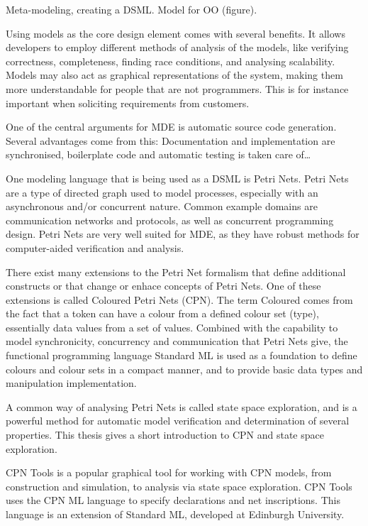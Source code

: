 Meta-modeling, creating a DSML. Model for OO (figure). 

Using models as the core design element comes with several benefits. It allows
developers to employ different methods of analysis of the models, like verifying
correctness, completeness, finding race conditions, and analysing scalability.
Models may also act as graphical representations of the system, making them more
understandable for people that are not programmers. This is for instance
important when soliciting requirements from customers.

One of the central arguments for MDE is automatic source code generation.
Several advantages come from this: Documentation and implementation are 
synchronised, boilerplate code and automatic testing is taken care of\ldots
{}

One modeling language that is being used as a DSML is Petri Nets. 
Petri Nets are a type of directed graph used to model processes,
especially with an asynchronous and/or concurrent nature. Common
example domains are communication networks and protocols, as
well as concurrent programming design.
Petri Nets are very well suited for MDE, as they have robust methods for
computer-aided verification and analysis. 

There exist many extensions to the Petri Net formalism that define additional
constructs or that change or enhace concepts of Petri Nets. One of these
extensions is called Coloured Petri Nets (CPN). The term Coloured comes from
the fact that a token can have a colour from a defined colour set (type),
essentially data values from a set of values. Combined with the capability to
model synchronicity, concurrency and communication that Petri Nets give, the
functional programming language Standard ML \cite{milner1997definition} is used as a foundation
to define colours and colour sets in a compact manner, and to provide basic data
types and manipulation implementation.

A common way of analysing
Petri Nets is called state space exploration, and is a powerful method for
automatic model verification and determination of several properties. This
thesis gives a short introduction to CPN and state space exploration.


CPN Tools \cite{cpntools} is a popular graphical
tool for working with CPN models, from construction and simulation, to analysis
via state space exploration. CPN Tools uses the CPN ML language to specify
declarations and net inscriptions.
This language is an extension of Standard ML, developed at Edinburgh
University. 
	
